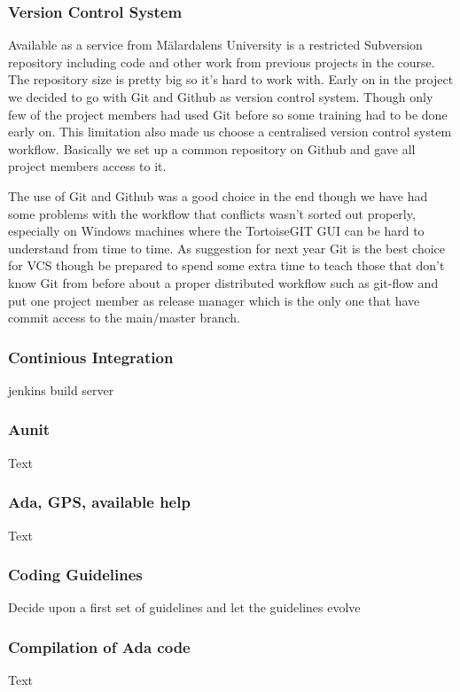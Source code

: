 \subsubsection{Version Control System}
Available as a service from M\"{a}lardalens University is a restricted Subversion repository
including code and other work from previous projects in the course. The repository
size is pretty big so it's hard to work with. Early on in the project we decided
to go with Git and Github as version control system. Though only few of the project
members had used Git before so some training had to be done early on. This limitation
also made us choose a centralised version control system workflow. Basically
we set up a common repository on Github \cite{web:github_naiad-auv-software}
and gave all project members access to it.

The use of Git and Github was a good choice in the end though we have had some
problems with the workflow that conflicts wasn't sorted out properly, especially
on Windows machines where the TortoiseGIT GUI can be hard to understand from time
to time. As suggestion for next year Git is the best choice for VCS though be prepared to
spend some extra time to teach those that don't know Git from before about a proper
distributed workflow such as git-flow \cite{web:git-flow} and put one project member
as release manager which is the only one that have commit access to the main/master branch.

\subsubsection{Continious Integration}
jenkins build server

\subsubsection{Aunit}
Text
\subsubsection{Ada, GPS, available help}
Text
\subsubsection{Coding Guidelines}
Decide upon a first set of guidelines and let the guidelines evolve

\subsubsection{Compilation of Ada code}
Text

